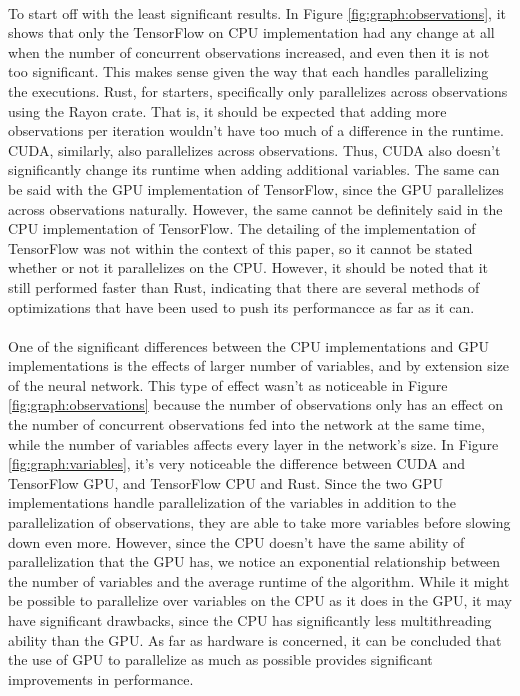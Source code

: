 \documentclass[12pt]{article}
\begin{document}
\paragraph{}
To start off with the least significant results. In Figure \ref{fig:graph:observations}, it shows that only the TensorFlow on CPU implementation had any change at all when the number of concurrent observations increased, and even then it is not too significant.
This makes sense given the way that each handles parallelizing the executions.
Rust, for starters, specifically only parallelizes across observations using the Rayon \cite{lib_rayon} crate.
That is, it should be expected that adding more observations per iteration wouldn't have too much of a difference in the runtime.
CUDA, similarly, also parallelizes across observations.
Thus, CUDA also doesn't significantly change its runtime when adding additional variables. 
The same can be said with the GPU implementation of TensorFlow, since the GPU parallelizes across observations naturally.
However, the same cannot be definitely said in the CPU implementation of TensorFlow.
The detailing of the implementation of TensorFlow was not within the context of this paper, so it cannot be stated whether or not it parallelizes on the CPU.
However, it should be noted that it still performed faster than Rust, indicating that there are several methods of optimizations that have been used to push its performancce as far as it can.

\paragraph{} %
One of the significant differences between the CPU implementations and GPU implementations is the effects of larger number of variables, and by extension size of the neural network.
This type of effect wasn't as noticeable in Figure \ref{fig:graph:observations} because the number of observations only has an effect on the number of concurrent observations fed into the network at the same time, while the number of variables affects every layer in the network's size.
In Figure \ref{fig:graph:variables}, it's very noticeable the difference between CUDA and TensorFlow GPU, and TensorFlow CPU and Rust.
Since the two GPU implementations handle parallelization of the variables in addition to the parallelization of observations, they are able to take more variables before slowing down even more.
However, since the CPU doesn't have the same ability of parallelization that the GPU has, we notice an exponential relationship between the number of variables and the average runtime of the algorithm.
While it might be possible to parallelize over variables on the CPU as it does in the GPU, it may have significant drawbacks, since the CPU has significantly less multithreading ability than the GPU.
As far as hardware is concerned, it can be concluded that the use of GPU to parallelize as much as possible provides significant improvements in performance.
\end{document}
